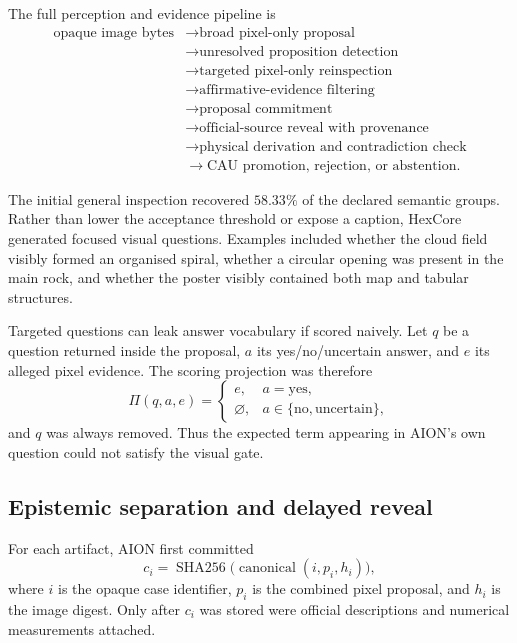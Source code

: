 The full perception and evidence pipeline is
\begin{equation}
\begin{split}
\text{opaque image bytes}
&\rightarrow \text{broad pixel-only proposal}\\
&\rightarrow \text{unresolved proposition detection}\\
&\rightarrow \text{targeted pixel-only reinspection}\\
&\rightarrow \text{affirmative-evidence filtering}\\
&\rightarrow \text{proposal commitment}\\
&\rightarrow \text{official-source reveal with provenance}\\
&\rightarrow \text{physical derivation and contradiction check}\\
&\rightarrow \text{CAU promotion, rejection, or abstention}.
\end{split}
\label{eq:arena-v6-pipeline}
\end{equation}

The initial general inspection recovered $58.33\%$ of the declared semantic
groups.  Rather than lower the acceptance threshold or expose a caption,
HexCore generated focused visual questions.  Examples included whether the
cloud field visibly formed an organised spiral, whether a circular opening was
present in the main rock, and whether the poster visibly contained both map and
tabular structures.

Targeted questions can leak answer vocabulary if scored naively.  Let $q$ be a
question returned inside the proposal, $a$ its yes/no/uncertain answer, and $e$
its alleged pixel evidence.  The scoring projection was therefore
\begin{equation}
\Pi(q,a,e)=
\begin{cases}
e, & a=\mathrm{yes},\\
\varnothing, & a\in\{\mathrm{no},\mathrm{uncertain}\},
\end{cases}
\label{eq:arena-v6-positive-evidence}
\end{equation}
and $q$ was always removed.  Thus the expected term appearing in AION's own
question could not satisfy the visual gate.


\subsection{Epistemic separation and delayed reveal}
\label{subsec:arena-v6-epistemic}

For each artifact, AION first committed
\begin{equation}
c_i=\operatorname{SHA256}
\bigl(\operatorname{canonical}(i,p_i,h_i)\bigr),
\label{eq:arena-v6-commitment}
\end{equation}
where $i$ is the opaque case identifier, $p_i$ is the combined pixel proposal,
and $h_i$ is the image digest.  Only after $c_i$ was stored were official
descriptions and numerical measurements attached.

